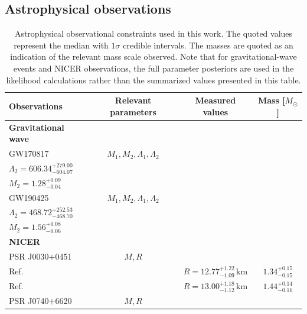 \documentclass[prd,twocolumn,a4paper,floatfix,nofootinbib,preprintnumbers,superscriptaddress]{revtex4-1}
\begin{document}
\subsection{Astrophysical observations}
\label{sec:astro_constraint}
\begin{table}
    \caption{Astrophysical observational constraints used in this work. The quoted values represent the median with $1\sigma$ credible intervals. The masses are quoted as an indication of the relevant mass scale observed. Note that for gravitational-wave events and NICER observations, the full parameter posteriors are used in the likelihood calculations rather than the summarized values presented in this table.}
     \label{tab:astro_constraints}
    \centering
    \begin{tabular*}{\textwidth}{@{\extracolsep{\fill}}lccc}
        \hline
        \textbf{Observations} & Relevant parameters & Measured values & Mass [$M_\odot$] \\
        \hline
        \textbf{Gravitational wave} &&& \\
        \hspace{0.05cm}GW170817~\cite{LIGOScientific:2017vwq,Abac:2023ujg}   & $M_1,M_2,\Lambda_1,\Lambda_2$  & \makecell[l]{$\Lambda_1=367.58^{+189.06}_{-366.28}$\\$\Lambda_2=606.34^{+279.00}_{-604.07}$}  & \makecell[c]{$M_1=1.46^{+0.05}_{-0.09}$\\$M_2=1.28^{+0.09}_{-0.04}$}\\
        \hspace{0.05cm}GW190425~\cite{LIGOScientific:2020aai,Abac:2023ujg}   & $M_1,M_2,\Lambda_1,\Lambda_2$  & \makecell[l]{$\Lambda_1=303.37^{+184.49}_{-303.23}$\\$\Lambda_2=468.72^{+252.53}_{-468.70}$}  & \makecell[c]{$M_1=1.75^{+0.05}_{-0.10}$\\$M_2=1.56^{+0.08}_{-0.06}$}\\
        \textbf{NICER} &&& \\
        \hspace{0.05cm}PSR J0030$+$0451 & $M,R$ && \\
        \hspace{0.05cm}Ref.~\cite{Vinciguerra:2023qxq}  && $R=12.77^{+1.22}_{-1.09}\,\text{km}$ & $1.34^{+0.15}_{-0.15}$\\
        \hspace{0.05cm}Ref.~\cite{Miller:2019cac}       && $R=13.00^{+1.18}_{-1.12}\,\text{km}$ & $1.44^{+0.14}_{-0.16}$\\
        \hspace{0.05cm}PSR J0740$+$6620 & $M,R$ && \\

\end{tabular*}
\end{table}
\end{document}
